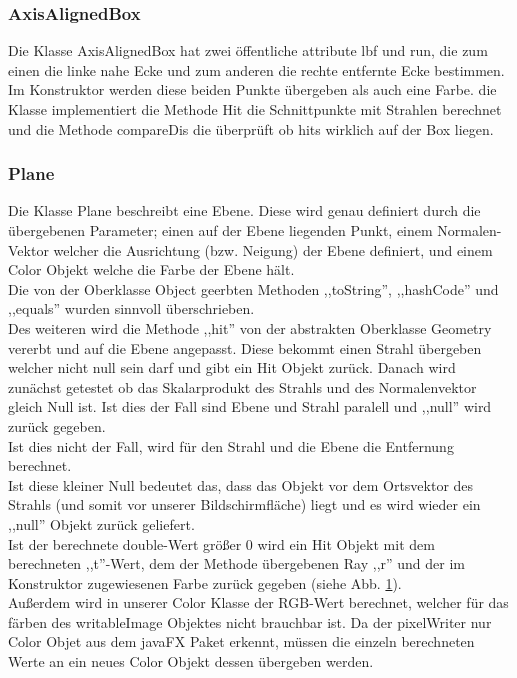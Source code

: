 \documentclass[14pt]{extarticle}
\begin{document}
\subsubsection{AxisAlignedBox}
Die Klasse AxisAlignedBox hat zwei öffentliche attribute lbf und run, die zum einen die linke nahe Ecke und zum anderen die rechte entfernte Ecke bestimmen. Im Konstruktor werden diese beiden Punkte übergeben als auch eine Farbe. die Klasse implementiert die Methode Hit die Schnittpunkte mit Strahlen berechnet und die Methode compareDis die überprüft ob hits wirklich auf der Box liegen.

\subsubsection{Plane}

Die Klasse Plane beschreibt eine Ebene. Diese wird genau definiert durch die übergebenen Parameter; einen auf der Ebene liegenden Punkt, einem Normalen-Vektor welcher die Ausrichtung (bzw. Neigung) der Ebene definiert, und einem Color Objekt welche die Farbe der Ebene hält. \\
Die von der Oberklasse Object geerbten Methoden ,,toString'', ,,hashCode'' und ,,equals'' wurden sinnvoll überschrieben.\\
Des weiteren wird die Methode ,,hit'' von der abstrakten Oberklasse Geometry vererbt und auf die Ebene angepasst. Diese bekommt einen Strahl übergeben welcher nicht null sein darf und gibt ein Hit Objekt zurück. Danach wird zunächst getestet ob das Skalarprodukt des Strahls und des Normalenvektor gleich Null ist. Ist dies der Fall sind Ebene und Strahl paralell und ,,null'' wird zurück gegeben. \\
Ist dies nicht der Fall, wird für den Strahl und die Ebene die Entfernung berechnet. \\
Ist diese kleiner Null bedeutet das, dass das Objekt vor dem Ortsvektor des Strahls (und somit vor unserer Bildschirmfläche) liegt und es wird wieder ein ,,null'' Objekt zurück geliefert. \\
Ist der berechnete double-Wert größer 0 wird ein Hit Objekt mit dem berechneten ,,t''-Wert, dem der Methode übergebenen Ray ,,r'' und der im Konstruktor zugewiesenen Farbe zurück gegeben (siehe Abb. \ref{Ebene}).\\
Außerdem wird in unserer Color Klasse der RGB-Wert berechnet, welcher für das färben des writableImage Objektes nicht brauchbar ist. Da der pixelWriter nur Color Objet aus dem javaFX Paket erkennt, müssen die einzeln berechneten Werte an ein neues Color Objekt dessen übergeben werden.
\begin{figure}[ht]
\begin{center}
\label{Ebene}
\end{center}
\end{figure}
\end{document}

